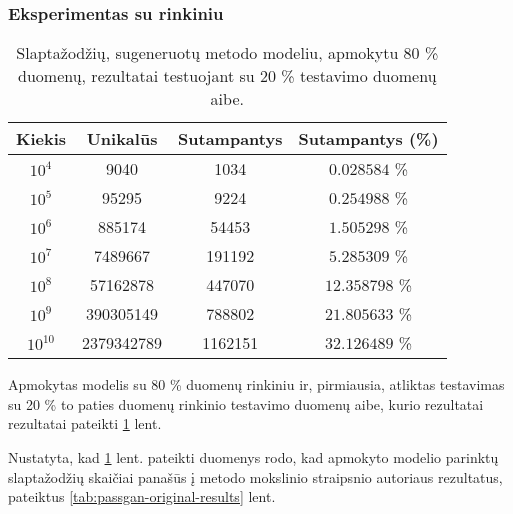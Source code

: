 \documentclass{VUMIFInfBakalaurinis}
\begin{document}
\subsubsection{Eksperimentas su  rinkiniu} %
\label{sec:pgrockyou}
\begin{table}[hb]
  \centering
  \caption{
    Slaptažodžių, sugeneruotų  metodo modeliu, apmokytu 80 \% 
     duomenų, rezultatai testuojant su 20 \% 
     testavimo duomenų aibe.
  }
  \begin{tabular}{|c|c|c|c|}
    \hline \textbf{Kiekis} & \textbf{Unikalūs} & \textbf{Sutampantys} & 
    \textbf{Sutampantys (\%)} \\
    \hline $10^4$ & 9040 & 1034 & $0.028584$ \% \\
    \hline $10^5$ & 95295 & 9224 & $0.254988$ \% \\
    \hline $10^6$ & 885174 & 54453 & $1.505298$ \% \\
    \hline $10^7$ & 7489667 & 191192 & $5.285309$ \% \\
    \hline $10^8$ & 57162878 & 447070 & $12.358798$ \% \\
    \hline $10^9$ & 390305149 & 788802 & $21.805633$ \% \\
    \hline $10^{10}$ & 2379342789 & 1162151 & $32.126489$ \% \\
    \hline
  \end{tabular}
  \label{tab:passgan-rockyou-results}
\end{table}
Apmokytas modelis su 80 \%  duomenų rinkiniu ir, pirmiausia, 
atliktas testavimas su 20 \% to paties duomenų rinkinio testavimo duomenų aibe, 
kurio rezultatai rezultatai pateikti \ref{tab:passgan-rockyou-results} lent.

Nustatyta, kad \ref{tab:passgan-rockyou-results} lent. pateikti duomenys rodo, 
kad apmokyto modelio parinktų slaptažodžių skaičiai panašūs į 
 metodo mokslinio straipsnio autoriaus rezultatus, pateiktus 
\ref{tab:passgan-original-results} lent.
\end{document}
